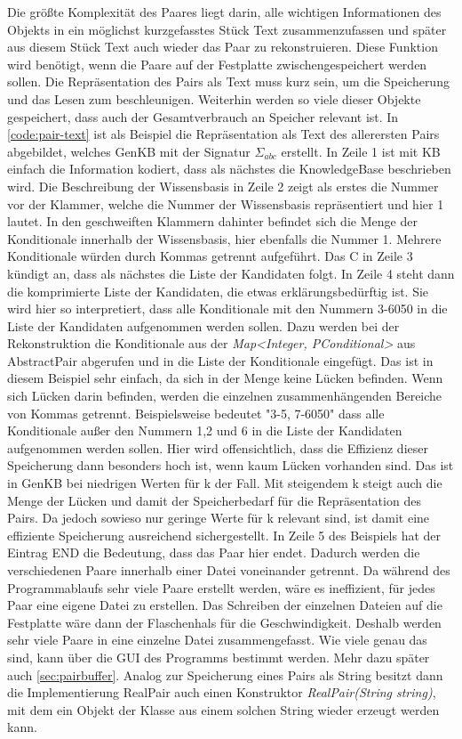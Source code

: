 \documentclass[12pt,a4paper]{article}
\begin{document}
Die größte Komplexität des Paares liegt darin, alle wichtigen Informationen des Objekts in ein möglichst kurzgefasstes Stück Text zusammenzufassen und später aus diesem Stück Text auch wieder das Paar zu rekonstruieren.  Diese Funktion wird benötigt, wenn die Paare auf der Festplatte zwischengespeichert werden sollen. Die Repräsentation des Pairs als Text muss kurz sein, um die Speicherung und das Lesen zum beschleunigen. Weiterhin werden so viele dieser Objekte gespeichert, dass auch der Gesamtverbrauch an Speicher relevant ist. In \autoref{code:pair-text} ist als Beispiel die Repräsentation als Text des allerersten Pairs abgebildet, welches GenKB mit der Signatur $\Sigma_{abc}$  erstellt. In Zeile 1 ist mit KB einfach die Information kodiert, dass als nächstes die KnowledgeBase beschrieben wird. Die Beschreibung der Wissensbasis in Zeile 2 zeigt als erstes die Nummer vor der Klammer, welche die Nummer der Wissensbasis repräsentiert und hier 1 lautet. In den geschweiften Klammern dahinter befindet sich die Menge der Konditionale innerhalb der Wissensbasis, hier ebenfalls die Nummer 1. Mehrere Konditionale würden durch Kommas getrennt aufgeführt. Das C in Zeile 3 kündigt an, dass als nächstes die Liste der Kandidaten folgt. In Zeile 4 steht dann die komprimierte Liste der Kandidaten, die etwas erklärungsbedürftig ist. Sie wird hier so interpretiert, dass alle Konditionale mit den Nummern 3-6050 in die Liste der Kandidaten aufgenommen werden sollen. Dazu werden bei der Rekonstruktion die Konditionale aus der \textit{Map<Integer, PConditional>} aus AbstractPair abgerufen und in die Liste der Konditionale eingefügt. Das ist in diesem Beispiel sehr einfach, da sich in der Menge keine Lücken befinden. Wenn sich Lücken darin befinden, werden die einzelnen zusammenhängenden Bereiche von Kommas getrennt. Beispielsweise bedeutet "3-5, 7-6050" \space dass alle Konditionale außer den Nummern 1,2 und 6 in die Liste der Kandidaten aufgenommen werden sollen. Hier wird offensichtlich, dass die Effizienz dieser Speicherung dann besonders hoch ist, wenn kaum Lücken vorhanden sind. Das ist in GenKB bei niedrigen Werten für k der Fall. Mit steigendem k steigt auch die Menge der Lücken und damit der Speicherbedarf für die Repräsentation des Pairs. Da jedoch sowieso nur geringe Werte für k relevant sind, ist damit eine effiziente Speicherung ausreichend sichergestellt. In Zeile 5 des Beispiels hat der Eintrag END die Bedeutung, dass das Paar hier endet. Dadurch werden die verschiedenen Paare innerhalb einer Datei voneinander getrennt. Da während des Programmablaufs sehr viele Paare erstellt werden, wäre es ineffizient, für jedes Paar eine eigene Datei zu erstellen. Das Schreiben der einzelnen Dateien auf die Festplatte wäre dann der Flaschenhals für die Geschwindigkeit. Deshalb werden sehr viele Paare in eine einzelne Datei zusammengefasst. Wie viele genau das sind, kann über die GUI des Programms bestimmt werden. Mehr dazu später auch \autoref{sec:pairbuffer}. Analog zur Speicherung eines Pairs als String besitzt dann die Implementierung RealPair auch einen Konstruktor \textit{RealPair(String string)}, mit dem ein Objekt der Klasse aus einem solchen String wieder erzeugt werden kann.
\end{document}
